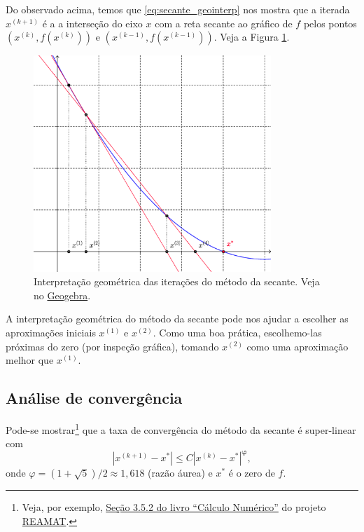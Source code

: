 Do observado acima, temos que \eqref{eq:secante_geointerp} nos mostra que a iterada $x^{(k+1)}$ é a a interseção do eixo $x$ com a reta secante ao gráfico de $f$ pelos pontos $(x^{(k)}, f(x^{(k)}))$ e $(x^{(k-1)}, f(x^{(k-1)}))$. Veja a Figura \ref{fig:secante_geointerp}.


\begin{figure}[h!]
  \centering
  \includegraphics[width=0.8\textwidth]{./cap_eq1d/dados/fig_secante_geointerp/fig_secante_geointerp}
  \caption{Interpretação geométrica das iterações do método da secante. Veja no \href{https://github.com/phkonzen/notas/blob/master/src/MatematicaNumerica/cap_eq1d/dados/fig_secante_geointerp/fig_secante_geointerp.ggb}{Geogebra}.}
  \label{fig:secante_geointerp}
\end{figure}


\begin{obs}
  A interpretação geométrica do método da secante pode nos ajudar a escolher as aproximações iniciais $x^{(1)}$ e $x^{(2)}$. Como uma boa prática, escolhemo-las próximas do zero (por inspeção gráfica), tomando $x^{(2)}$ como uma aproximação melhor que $x^{(1)}$. 
\end{obs}

\subsection{Análise de convergência}

Pode-se mostrar\footnote{Veja, por exemplo, \href{https://www.ufrgs.br/reamat/CalculoNumerico/livro-oct/sdeduv-metodo_das_secantes.html}{Seção 3.5.2 do livro ``Cálculo Numérico''} do projeto \href{https://www.ufrgs.br/reamat}{REAMAT}.} que a taxa de convergência do método da secante é super-linear com
\begin{equation}
  |x^{(k+1)}-x^*| \leq C|x^{(k)}-x^*|^{\pmb{\varphi}},
\end{equation}
onde $\varphi = (1+\sqrt{5})/2\approx 1,618$ (razão áurea) e $x^*$ é o zero de $f$.


